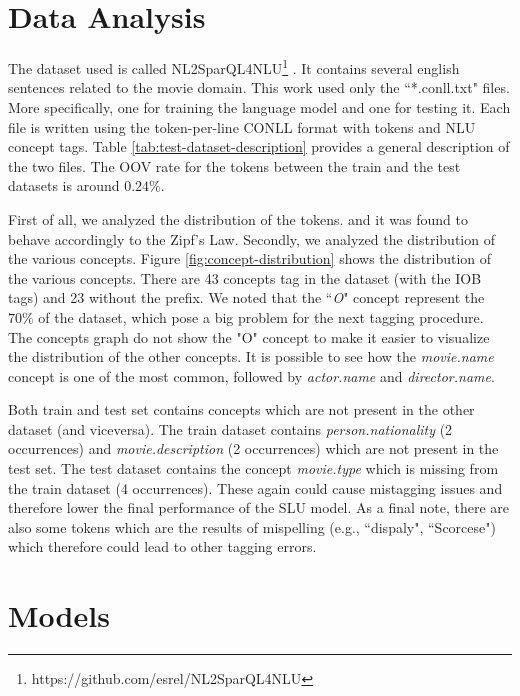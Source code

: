 \documentclass[11pt,a4paper]{article}
\begin{document}
\section{Data Analysis}

The dataset used is called NL2SparQL4NLU\footnote{https://github.com/esrel/NL2SparQL4NLU} \citep{Chen2014DerivingLR, gobbi2018concept}. It contains several english sentences related to the movie domain. This work used only the ``*.conll.txt" files. More specifically, one for training the language model and one for testing it. Each file is written using the token-per-line CONLL format with tokens and NLU concept tags. Table \ref{tab:test-dataset-description} provides a general description of the two files. The OOV rate for the tokens between the train and the test datasets is around $0.24\%$.


First of all, we analyzed the distribution of the tokens. and it was found to behave accordingly to the
Zipf's Law. Secondly, we analyzed the distribution of the various concepts. Figure \ref{fig:concept-distribution} shows the distribution of the various concepts. There are 43 concepts tag in the dataset (with the IOB tags) and 23 without the prefix. We noted that the ``\textit{O}" concept represent the $70\%$ of the dataset, which pose a big problem for the next tagging procedure. The concepts graph do not show the "O" concept to make it easier to visualize the distribution of the other concepts. It is possible to see how the \textit{movie.name} concept is one of the most common, followed by \textit{actor.name} and \textit{director.name}.

Both train and test set contains concepts which are not present in the other dataset (and viceversa). The train dataset contains \textit{person.nationality} (2 occurrences) and \textit{movie.description} (2 occurrences) which are not present in the test set. The test dataset contains the concept \textit{movie.type} which is missing from the train dataset (4 occurrences). These again could cause mistagging issues and therefore lower the final performance of the SLU model. 
As a final note, there are also
some tokens which are the results of mispelling (e.g., ``dispaly", ``Scorcese") which therefore could lead to other tagging errors.


\section{Models}
\end{document}
